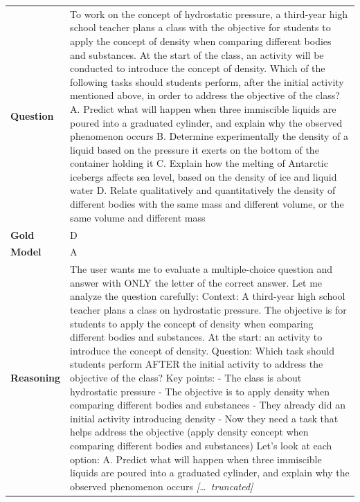 \begin{longtable}{@{}l p{13cm}@{}}
  \textbf{Question}  & To work on the concept of hydrostatic pressure, a third-year high school teacher plans a class with the objective for students to apply the concept of density when comparing different bodies and substances. At the start of the class, an activity will be conducted to introduce the concept of density. Which of the following tasks should students perform, after the initial activity mentioned above, in order to address the objective of the class? \newline A. Predict what will happen when three immiscible liquids are poured into a graduated cylinder, and explain why the observed phenomenon occurs \newline B. Determine experimentally the density of a liquid based on the pressure it exerts on the bottom of the container holding it \newline C. Explain how the melting of Antarctic icebergs affects sea level, based on the density of ice and liquid water \newline D. Relate qualitatively and quantitatively the density of different bodies with the same mass and different volume, or the same volume and different mass   \\
  \textbf{Gold}      & D       \\
  \textbf{Model}     & A  \\
  \textbf{Reasoning} & The user wants me to evaluate a multiple-choice question and answer with ONLY the letter of the correct answer. \newline Let me analyze the question carefully: \newline Context: A third-year high school teacher plans a class on hydrostatic pressure. The objective is for students to apply the concept of density when comparing different bodies and substances. \newline At the start: an activity to introduce the concept of density. \newline Question: Which task should students perform AFTER the initial activity to address the objective of the class? \newline Key points: \newline - The class is about hydrostatic pressure \newline - The objective is to apply density when comparing different bodies and substances \newline - They already did an initial activity introducing density \newline - Now they need a task that helps address the objective (apply density concept when comparing different bodies and substances) \newline Let's look at each option: \newline A. Predict what will happen when three immiscible liquids are poured into a graduated cylinder, and explain why the observed phenomenon occurs \newline \textit{[\ldots\ truncated]}  \\
  \midrule
  \bottomrule
\end{longtable}